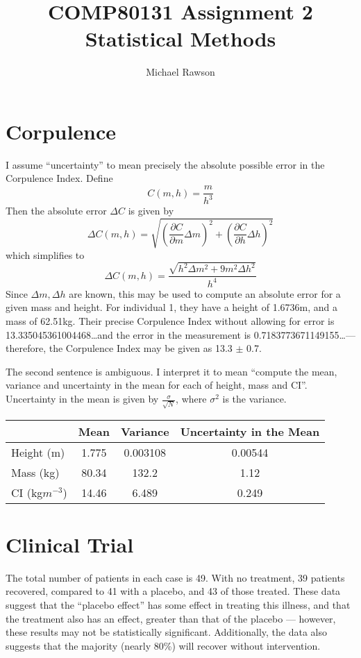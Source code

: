 \documentclass{article}
\title{COMP80131 Assignment 2\\Statistical Methods}
\author{Michael Rawson}
\begin{document}
\maketitle
\section{Corpulence}
I assume ``uncertainty'' to mean precisely the absolute possible error in the Corpulence Index.
Define
\[
C(m, h) = \frac{m}{h^3}
\]
Then the absolute error \(\Delta C\) is given by
\[
\Delta C(m, h) = \sqrt{\left(\frac{\partial C}{\partial m}\Delta m\right)^2 + \left(\frac{\partial C}{\partial h}\Delta h\right)^2}
\]
which simplifies to
\[
\Delta C(m, h) = \frac{\sqrt{h^2\Delta m^2 + 9m^2\Delta h^2}}{h^4}
\]
Since \(\Delta m, \Delta h\) are known, this may be used to compute an absolute error for a given mass and height.
For individual 1, they have a height of 1.6736m, and a mass of 62.51kg.
Their precise Corpulence Index without allowing for error is 13.335045361004468\ldots and the error in the measurement is 0.7183773671149155\ldots --- therefore, the Corpulence Index may be given as 13.3 \(\pm\) 0.7.

The second sentence is ambiguous.
I interpret it to mean ``compute the mean, variance and uncertainty in the mean for each of height, mass and CI''.
Uncertainty in the mean is given by \(\frac{\sigma}{\sqrt{N}}\), where \(\sigma^2\) is the variance.
\begin{center}
\begin{tabular}{l c c c}
& Mean & Variance & Uncertainty in the Mean \\
\hline
Height (m) & 1.775 & 0.003108 & 0.00544\\
Mass (kg) & 80.34 & 132.2 & 1.12\\
CI (kg\(m^{-3}\)) & 14.46 & 6.489 & 0.249\\
\end{tabular}
\end{center}

\section{Clinical Trial}
The total number of patients in each case is 49.
With no treatment, 39 patients recovered, compared to 41 with a placebo, and 43 of those treated.
These data suggest that the ``placebo effect'' has some effect in treating this illness, and that the treatment also has an effect, greater than that of the placebo --- however, these results may not be statistically significant.
Additionally, the data also suggests that the majority (nearly 80\%) will recover without intervention.
\end{document}
